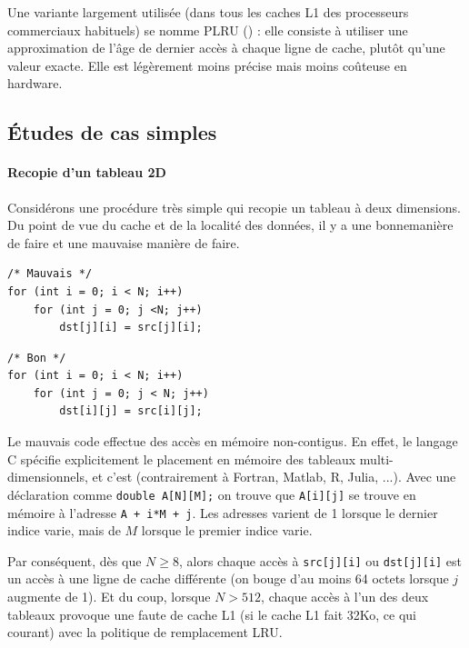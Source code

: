 Une variante largement utilisée (dans tous les caches L1 des processeurs
commerciaux habituels) se nomme PLRU () : elle consiste à
utiliser une approximation de l'âge de dernier accès à chaque ligne de cache,
plutôt qu'une valeur exacte. Elle est légèrement moins précise mais moins
coûteuse en hardware.

\subsection{Études de cas simples}

\paragraph{Recopie d'un tableau 2D} Considérons une procédure très simple qui
recopie un tableau à deux dimensions. Du point de vue du cache et de la localité
des données, il y a une \og bonne\fg manière de faire et une \og mauvaise\fg
manière de faire.

\medskip

\begin{minipage}{0.49\textwidth}
\begin{verbatim}
/* Mauvais */
for (int i = 0; i < N; i++)
    for (int j = 0; j <N; j++)
        dst[j][i] = src[j][i];
\end{verbatim}
\end{minipage}%
\begin{minipage}{0.49\textwidth}
\begin{verbatim}
/* Bon */
for (int i = 0; i < N; i++)
    for (int j = 0; j < N; j++)
        dst[i][j] = src[i][j];
\end{verbatim}
\end{minipage}

\medskip

Le mauvais code effectue des accès en mémoire non-contigus. En effet, le langage
C spécifie explicitement le placement en mémoire des tableaux
multi-dimensionnels, et c'est  (contrairement à Fortran,
Matlab, R, Julia, ...). Avec une déclaration comme \texttt{double
  A[N][M];} on trouve que \texttt{A[i][j]} se trouve en mémoire à
l'adresse \texttt{A + i*M + j}. Les adresses varient de 1 lorsque le
dernier indice varie, mais de $M$ lorsque le premier indice varie.

Par conséquent, dès que $N \geq 8$, alors chaque accès à
\texttt{src[j][i]} ou \texttt{dst[j][i]} est un accès à une ligne
de cache différente (on bouge d'au moins 64 octets lorsque $j$ augmente de
1). Et du coup, lorsque $N > 512$, chaque accès à l'un des deux tableaux
provoque une faute de cache L1 (si le cache L1 fait 32Ko, ce qui courant) avec
la politique de remplacement LRU.

